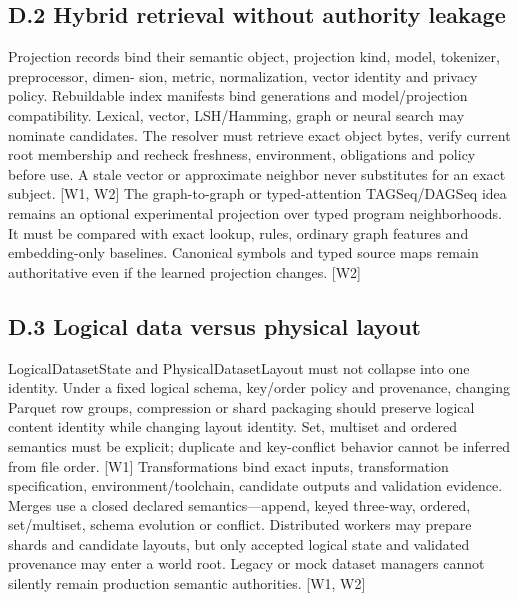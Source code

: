\subsection*{D.2 Hybrid retrieval without authority leakage}

Projection records bind their semantic object, projection kind, model, tokenizer, preprocessor, dimen-
sion, metric, normalization, vector identity and privacy policy. Rebuildable index manifests bind
generations and model/projection compatibility. Lexical, vector, LSH/Hamming, graph or neural
search may nominate candidates. The resolver must retrieve exact object bytes, verify current root
membership and recheck freshness, environment, obligations and policy before use. A stale vector or
approximate neighbor never substitutes for an exact subject. [W1, W2]
The graph-to-graph or typed-attention TAGSeq/DAGSeq idea remains an optional experimental
projection over typed program neighborhoods. It must be compared with exact lookup, rules, ordinary
graph features and embedding-only baselines. Canonical symbols and typed source maps remain
authoritative even if the learned projection changes. [W2]

\subsection*{D.3 Logical data versus physical layout}

LogicalDatasetState and PhysicalDatasetLayout must not collapse into one identity. Under a fixed
logical schema, key/order policy and provenance, changing Parquet row groups, compression or
shard packaging should preserve logical content identity while changing layout identity. Set, multiset
and ordered semantics must be explicit; duplicate and key-conflict behavior cannot be inferred from
file order. [W1]
Transformations bind exact inputs, transformation specification, environment/toolchain, candidate
outputs and validation evidence. Merges use a closed declared semantics—append, keyed three-way,
ordered, set/multiset, schema evolution or conflict. Distributed workers may prepare shards and
candidate layouts, but only accepted logical state and validated provenance may enter a world root.
Legacy or mock dataset managers cannot silently remain production semantic authorities. [W1, W2]

